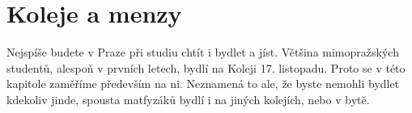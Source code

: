 \section{Koleje a menzy}
Nejspíše budete v Praze při studiu chtít i bydlet a jíst. Většina mimopražských
studentů, alespoň v prvních letech, bydlí na Koleji 17. listopadu. Proto se v
této kapitole zaměříme především na ni. Neznamená to ale, že byste nemohli
bydlet kdekoliv jinde, spousta matfyzáků bydlí i na jiných kolejích, nebo v
bytě.